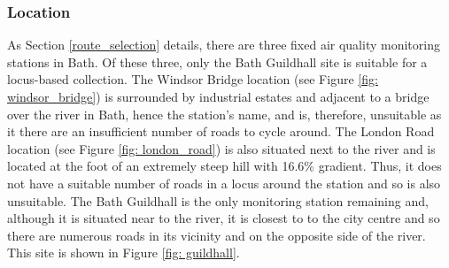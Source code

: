 \documentclass[11pt]{report}
\begin{document}
\subsubsection{Location}

As Section \ref{route_selection} details, there are three fixed air quality monitoring stations in Bath. Of these three, only the Bath Guildhall site is suitable for a locus-based collection. The Windsor Bridge location (see Figure \ref{fig: windsor_bridge}) is surrounded by industrial estates and adjacent to a bridge over the river in Bath, hence the station's name, and is, therefore, unsuitable as it there are an insufficient number of roads to cycle around. The London Road location (see Figure \ref{fig: london_road}) is also situated next to the river and is located at the foot of an extremely steep hill with 16.6\% gradient. Thus, it does not have a suitable number of roads in a locus around the station and so is also unsuitable. The Bath Guildhall is the only monitoring station remaining and, although it is situated near to the river, it is closest to to the city centre and so there are numerous roads in its vicinity and on the opposite side of the river. This site is shown in Figure \ref{fig: guildhall}.
\end{document}
